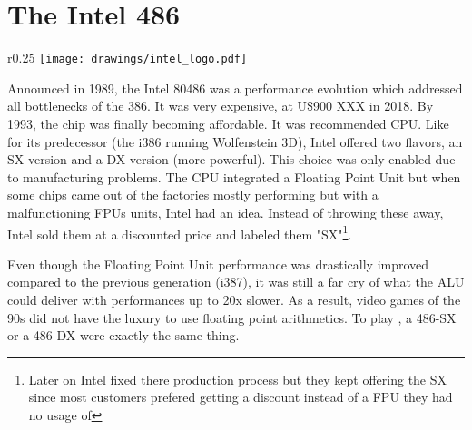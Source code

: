 \section{The Intel 486}

\begin{wrapfigure}[5]{r}{0.25\textwidth}
\centering
\texttt{[image: drawings/intel\_logo.pdf]}
\end{wrapfigure}

Announced in 1989, the Intel 80486 was a performance evolution which addressed all bottlenecks of the 386. It was very expensive, at U\$900 XXX in 2018. By 1993, the chip was finally becoming affordable. It was \doom recommended CPU. Like for its predecessor (the i386 running Wolfenstein 3D), Intel offered two flavors, an SX version and a DX version (more powerful). This choice was only enabled due to manufacturing problems. The CPU integrated a Floating Point Unit but when some chips came out of the factories mostly performing but with a malfunctioning FPUs units, Intel had an idea. Instead of throwing these away, Intel sold them at a discounted price and labeled them "SX"\footnote{Later on Intel fixed there production process but they kept offering the SX since most customers prefered getting a discount instead of a FPU they had no usage of}.\\
\par
 

      \par

Even though the Floating Point Unit performance was drastically improved compared to the previous generation (i387), it was still a far cry of what the ALU could deliver with performances up to 20x slower. As a result, video games of the 90s did not have the luxury to use floating point arithmetics. To play \doom, a 486-SX or a 486-DX were exactly the same thing.\\
\par




